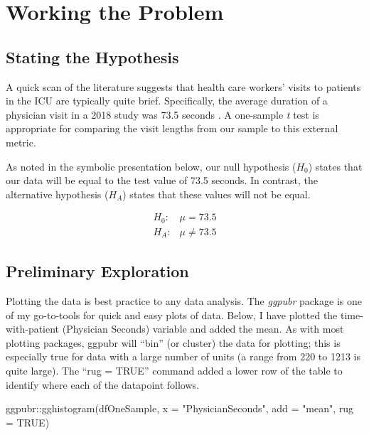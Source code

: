 \documentclass[
  11pt,
]{book}
\newenvironment{Shaded}{\begin{snugshade}}{\end{snugshade}}
\newcommand{\AttributeTok}[1]{\textcolor[rgb]{0.77,0.63,0.00}{#1}}
\newcommand{\ConstantTok}[1]{\textcolor[rgb]{0.00,0.00,0.00}{#1}}
\newcommand{\FunctionTok}[1]{\textcolor[rgb]{0.00,0.00,0.00}{#1}}
\newcommand{\NormalTok}[1]{#1}
\newcommand{\SpecialCharTok}[1]{\textcolor[rgb]{0.00,0.00,0.00}{#1}}
\newcommand{\StringTok}[1]{\textcolor[rgb]{0.31,0.60,0.02}{#1}}
\begin{document}
\hypertarget{working-the-problem}{%
\section{Working the Problem}\label{working-the-problem}}

\hypertarget{stating-the-hypothesis}{%
\subsection{Stating the Hypothesis}\label{stating-the-hypothesis}}

A quick scan of the literature suggests that health care workers' visits to patients in the ICU are typically quite brief. Specifically, the average duration of a physician visit in a 2018 study was 73.5 seconds \citep{butler_estimating_2018}. A one-sample \emph{t} test is appropriate for comparing the visit lengths from our sample to this external metric.

As noted in the symbolic presentation below, our null hypothesis (\(H_0\)) states that our data will be equal to the test value of 73.5 seconds. In contrast, the alternative hypothesis (\(H_A\)) states that these values will not be equal.

\[
\begin{array}{ll}
H_0: & \mu = 73.5 \\
H_A: & \mu \neq 73.5
\end{array}
\]

\hypertarget{preliminary-exploration}{%
\subsection{Preliminary Exploration}\label{preliminary-exploration}}

Plotting the data is best practice to any data analysis. The \emph{ggpubr} package is one of my go-to-tools for quick and easy plots of data. Below, I have plotted the time-with-patient (Physician Seconds) variable and added the mean. As with most plotting packages, ggpubr will ``bin'' (or cluster) the data for plotting; this is especially true for data with a large number of units (a range from 220 to 1213 is quite large). The ``rug = TRUE'' command added a lower row of the table to identify where each of the datapoint follows.

\begin{Shaded}
\begin{Highlighting}[]
\NormalTok{ggpubr}\SpecialCharTok{::}\FunctionTok{gghistogram}\NormalTok{(dfOneSample, }\AttributeTok{x =} \StringTok{"PhysicianSeconds"}\NormalTok{, }\AttributeTok{add =} \StringTok{"mean"}\NormalTok{,}
    \AttributeTok{rug =} \ConstantTok{TRUE}\NormalTok{)}
\end{Highlighting}
\end{Shaded}
\end{document}
